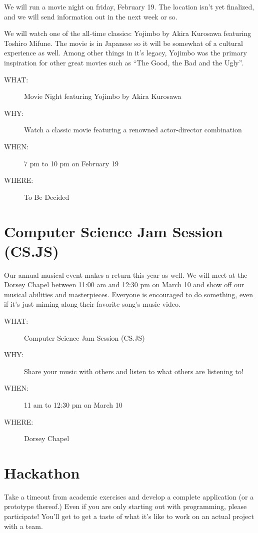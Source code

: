 We will run a movie night on friday, February 19. The location isn't yet
finalized, and we will send information out in the next week or so.

We will watch one of the all-time classics: Yojimbo by Akira Kurosawa featuring
Toshiro Mifune. The movie is in Japanese so it will be somewhat of a cultural
experience as well. Among other things in it's legacy, Yojimbo was the primary
inspiration for other great movies such as \textquotedblleft{}The Good, the Bad and the
Ugly\textquotedblright{}.

\begin{description}
\item[{WHAT:}] Movie Night featuring Yojimbo by Akira Kurosawa
\item[{WHY:}] Watch a classic movie featuring a renowned actor-director combination
\item[{WHEN:}] 7 pm to 10 pm on February 19
\item[{WHERE:}] To Be Decided
\end{description}


\newpage


\section{Computer Science Jam Session (CS.JS)}
\label{sec-6}

Our annual musical event makes a return this year as well. We will meet at the
Dorsey Chapel between 11:00 am and 12:30 pm on March 10 and show off our
musical abilities and masterpieces. Everyone is encouraged to do something,
even if it's just miming along their favorite song's music video.

\begin{description}
\item[{WHAT:}] Computer Science Jam Session (CS.JS)
\item[{WHY:}] Share your music with others and listen to what others are listening to!
\item[{WHEN:}] 11 am to 12:30 pm on March 10
\item[{WHERE:}] Dorsey Chapel
\end{description}


\newpage


\section{Hackathon}
\label{sec-7}

Take a timeout from academic exercises and develop a complete application (or a
prototype thereof.) Even if you are only starting out with programming, please
participate! You'll get to get a taste of what it's like to work on an actual
project with a team.

